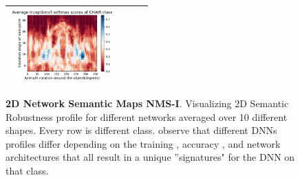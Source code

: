 \begin{figure}[h]
\begin{tabular}{||c|c|c|c||}
\includegraphics[width = 4cm]{supimages/nms2d/Inceptionv3_chair_Average.pdf} \\
\hline
\end{tabular}
   \caption{\small \textbf{2D Network Semantic Maps NMS-I}. Visualizing 2D Semantic Robustness profile for different networks averaged over 10 different shapes. Every row is different class. observe that different DNNs profiles differ depending on the training , accuracy , and network architectures that all result in a unique ''signatures" for the DNN on that class.}
   \vspace{-8pt}
   \label{fig:nsm2d-1}
\end{figure}

